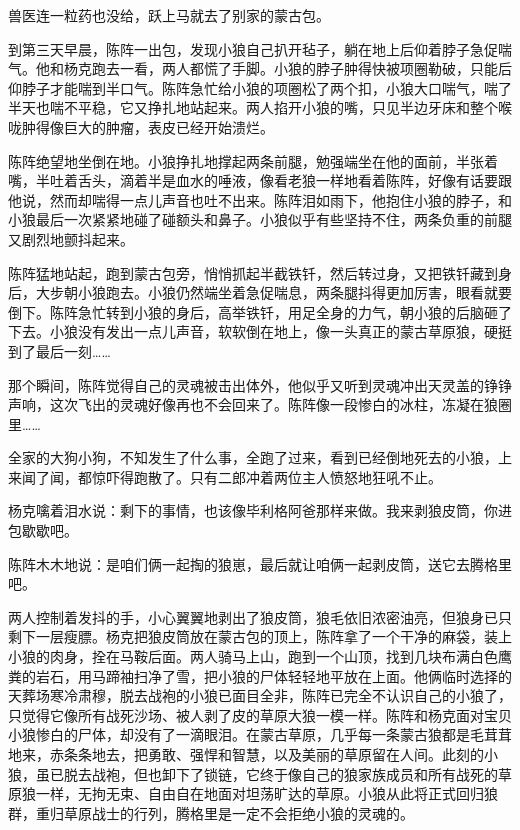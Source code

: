 \par 兽医连一粒药也没给，跃上马就去了别家的蒙古包。
\par 
\par 到第三天早晨，陈阵一出包，发现小狼自己扒开毡子，躺在地上后仰着脖子急促喘气。他和杨克跑去一看，两人都慌了手脚。小狼的脖子肿得快被项圈勒破，只能后仰脖子才能喘到半口气。陈阵急忙给小狼的项圈松了两个扣，小狼大口喘气，喘了半天也喘不平稳，它又挣扎地站起来。两人掐开小狼的嘴，只见半边牙床和整个喉咙肿得像巨大的肿瘤，表皮已经开始溃烂。
\par 陈阵绝望地坐倒在地。小狼挣扎地撑起两条前腿，勉强端坐在他的面前，半张着嘴，半吐着舌头，滴着半是血水的唾液，像看老狼一样地看着陈阵，好像有话要跟他说，然而却喘得一点儿声音也吐不出来。陈阵泪如雨下，他抱住小狼的脖子，和小狼最后一次紧紧地碰了碰额头和鼻子。小狼似乎有些坚持不住，两条负重的前腿又剧烈地颤抖起来。
\par 陈阵猛地站起，跑到蒙古包旁，悄悄抓起半截铁钎，然后转过身，又把铁钎藏到身后，大步朝小狼跑去。小狼仍然端坐着急促喘息，两条腿抖得更加厉害，眼看就要倒下。陈阵急忙转到小狼的身后，高举铁钎，用足全身的力气，朝小狼的后脑砸了下去。小狼没有发出一点儿声音，软软倒在地上，像一头真正的蒙古草原狼，硬挺到了最后一刻……
\par 那个瞬间，陈阵觉得自己的灵魂被击出体外，他似乎又听到灵魂冲出天灵盖的铮铮声响，这次飞出的灵魂好像再也不会回来了。陈阵像一段惨白的冰柱，冻凝在狼圈里……
\par 全家的大狗小狗，不知发生了什么事，全跑了过来，看到已经倒地死去的小狼，上来闻了闻，都惊吓得跑散了。只有二郎冲着两位主人愤怒地狂吼不止。
\par 杨克噙着泪水说：剩下的事情，也该像毕利格阿爸那样来做。我来剥狼皮筒，你进包歇歇吧。
\par 陈阵木木地说：是咱们俩一起掏的狼崽，最后就让咱俩一起剥皮筒，送它去腾格里吧。
\par 两人控制着发抖的手，小心翼翼地剥出了狼皮筒，狼毛依旧浓密油亮，但狼身已只剩下一层瘦膘。杨克把狼皮筒放在蒙古包的顶上，陈阵拿了一个干净的麻袋，装上小狼的肉身，拴在马鞍后面。两人骑马上山，跑到一个山顶，找到几块布满白色鹰粪的岩石，用马蹄袖扫净了雪，把小狼的尸体轻轻地平放在上面。他俩临时选择的天葬场寒冷肃穆，脱去战袍的小狼已面目全非，陈阵已完全不认识自己的小狼了，只觉得它像所有战死沙场、被人剥了皮的草原大狼一模一样。陈阵和杨克面对宝贝小狼惨白的尸体，却没有了一滴眼泪。在蒙古草原，几乎每一条蒙古狼都是毛茸茸地来，赤条条地去，把勇敢、强悍和智慧，以及美丽的草原留在人间。此刻的小狼，虽已脱去战袍，但也卸下了锁链，它终于像自己的狼家族成员和所有战死的草原狼一样，无拘无束、自由自在地面对坦荡旷达的草原。小狼从此将正式回归狼群，重归草原战士的行列，腾格里是一定不会拒绝小狼的灵魂的。
